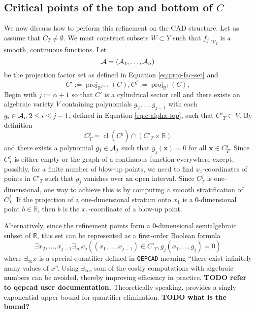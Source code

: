 \documentclass[
]{book}
\theoremstyle{definition}
\theoremstyle{definition}
\theoremstyle{definition}
\theoremstyle{definition}
\theoremstyle{remark}
\begin{document}
\hypertarget{critical-points-of-the-top-and-bottom-of-c}{%
\subsection{\texorpdfstring{Critical points of the top and bottom of \(C\)}{Critical points of the top and bottom of C}}\label{critical-points-of-the-top-and-bottom-of-c}}

We now discuss how to perform this refinement on the CAD structure. Let us assume that \(C_T\ne \emptyset\). We must construct subsets \(W \subset Y\) such that \(f_j\vert_{W_T}\) is a smooth, continuous functions.
Let
\[
{\cal A} = ({\cal A}_1, \ldots, {\cal A}_n)
\]
be the projection factor set as defined in Equation \eqref{eq:proj-fac-set} and
\[
C' := {\operatorname{proj}_{\mathbb{R}^{j-1}}}(C), C^j := {\operatorname{proj}_{\mathbb{R}^{j}}}(C),
\]
Begin with \(j := \alpha+1\) so that \(C'\) is a cylindrical sector cell and there exists an algebraic variety \(V\) containing polynomials \(g_2,\ldots,g_{j-1}\) with each \(g_i \in {\cal A}_i, 2 \le i \le j-1\), defined in Equation \eqref{eq:c-alpha-top}, such that \(C'_T\subset V\).
By definition \[
C^j_T = {\operatorname{cl} \left( C^j \right)} \cap (C'_T \times \mathbb{R})
\] and there exists a polynomial \(g_j \in {\cal A}_j\) such that \(g_j(\mathbf{x}) = 0\) for all \(\mathbf{x} \in C^j_T\). Since \(C^j_T\) is either empty or the graph of a continuous function everywhere except, possibly, for a finite number of blow-up points, we need to find \(x_1\)-coordinates of points in \(C'_T\) such that \(g_j\) vanishes over an open interval.
Since \(C^j_T\) is one-dimensional, one way to achieve this is by computing a smooth stratification of \(C^j_T\). If the projection of a one-dimensional stratum onto \(x_1\) is a \(0\)-dimensional point \(b \in \mathbb{R}\), then \(b\) is the \(x_1\)-coordinate of a blow-up point.

Alternatively, since the refinement points form a \(0\)-dimensional semialgebraic subset of \(\mathbb{R}\), this set can be represented as a first-order Boolean formula
\[
\exists x_2,\ldots,x_{j-1} \exists_\infty x_j ((x_1,\ldots,x_{j-1}) \in C'_T, g_j(x_1,\ldots,g_j) = 0)
\]
where \(\exists_\infty x\) is a special quantifier defined in \texttt{QEPCAD} meaning ``there exist infinitely many values of \(x\)''.
Using \(\exists_\infty\), som of the costly computations with algebraic numbers can be avoided, thereby improving efficiency in practice. \textbf{TODO refer to qepcad user documentation.}
Theoretically speaking, \citep[Algorithm 14.21]{bpr2006} provides a singly exponential upper bound for quantifier elimination. \textbf{TODO what is the bound?}
\end{document}
